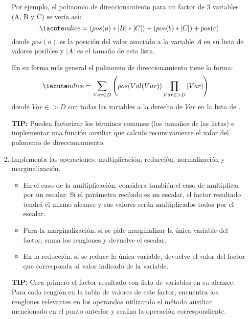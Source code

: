 \begin{enumerate}
  Por ejemplo, el polinomio de direccionamiento para un factor de 3 variables (A, B y C) se vería así:
      \[\iacute ndice = (pos(a) * |B| * |C|) + (pos(b) * |C|) + pos(c)\]
    donde \(pos(a)\) es la posición del valor asociado a la variable \(A\) en su lista de valores posibles y \(|A|\) es el tamaño de esta lista.

  En su forma más general el polinomio de direccionamiento tiene la forma:
  \begin{align*}
   \iacute ndice &= \sum_{Var \in D} \left( pos(Val(Var)) \prod_{Var \in >D} |Var| \right)
  \end{align*}
  donde $Var \in >D$ son todas las variables a la derecha de $Var$ en la lista de .
    
  \textbf{TIP:} Pueden factorizar los términos comunes (los tamaños de las listas) e implementar una función auxiliar que calcule recursivamente el valor del polinomio de direccionamiento.
  
  \item Implementa las operaciones: multiplicación, reducción, normalización y marginalización.
  
  \begin{itemize}
   \item En el caso de la multiplicación, considera también el caso de multiplicar por un escalar.  Si el parámetro recibido es un escalar, el factor resultado tendrá el mismo alcance y sus valores serán multiplicados todos por el escalar.
   
   \item Para la marginalización, si se pide marginalizar la única variable del factor, suma los renglones y devuelve el escalar.
   
   \item En la reducción, si se reduce la única variable, devuelve el valor del factor que corresponda al valor indicado de la variable.
  \end{itemize}

  \textbf{TIP:} Crea primero el factor resultado con lista de variables en su alcance. Para cada renglón en la tabla de valores de este factor, encuentra los renglones relevantes en los operandos utilizando el método auxiliar mencionado en el punto anterior y realiza la operación correspondiente.
\end{enumerate}

